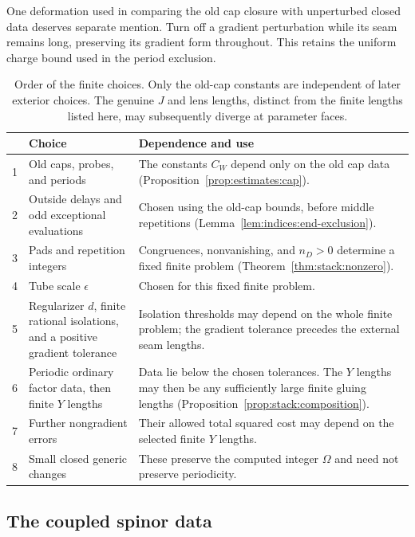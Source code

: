 One deformation used in comparing the old cap closure with unperturbed
closed data deserves separate mention.  Turn off a gradient perturbation
while its seam remains long, preserving its gradient form throughout.
This retains the uniform charge bound used in the period exclusion.
\begin{table}[htbp]
\centering
\small
\begin{tabular}{@{}p{}p{}p{}@{}}
\toprule
 & Choice & Dependence and use \\
\midrule
1 & Old caps, probes, and periods & The constants $C_W$ depend only on
the old cap data (Proposition~\ref{prop:estimates:cap}). \\
2 & Outside delays and odd exceptional evaluations & Chosen using the
old-cap bounds, before middle repetitions
(Lemma~\ref{lem:indices:end-exclusion}). \\
3 & Pads and repetition integers & Congruences, nonvanishing, and
$n_D>0$ determine a fixed finite problem
(Theorem~\ref{thm:stack:nonzero}). \\
4 & Tube scale $\epsilon$ & Chosen for this fixed finite problem. \\
5 & Regularizer $d$, finite rational isolations, and a positive gradient
tolerance & Isolation thresholds may depend on the whole finite
problem; the gradient tolerance precedes the external seam lengths. \\
6 & Periodic ordinary factor data, then finite $Y$ lengths & Data lie
below the chosen tolerances.  The $Y$ lengths may then be any sufficiently
large finite gluing lengths (Proposition~\ref{prop:stack:composition}). \\
7 & Further nongradient errors & Their allowed total squared cost may
depend on the selected finite $Y$ lengths. \\
8 & Small closed generic changes & These preserve the computed integer
$\Omega$ and need not preserve periodicity. \\
\bottomrule
\end{tabular}
\caption{Order of the finite choices.  Only the old-cap constants are
independent of later exterior choices.  The genuine $J$ and lens lengths,
distinct from the finite lengths listed here, may subsequently diverge
at parameter faces.}
\label{tab:stack:choices}
\end{table}

\subsection{The coupled spinor data}

